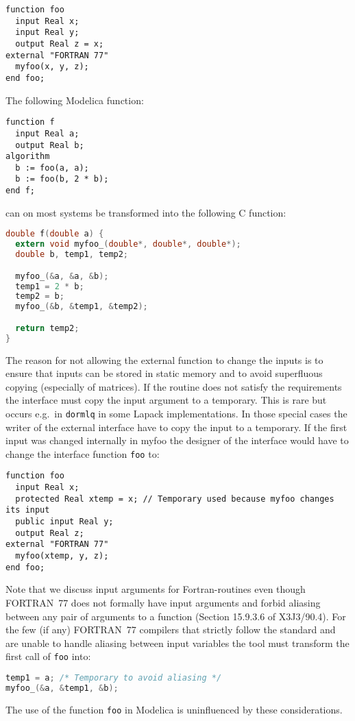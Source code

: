 \begin{example}
\begin{lstlisting}[language=modelica]
function foo
  input Real x;
  input Real y;
  output Real z = x;
external "FORTRAN 77"
  myfoo(x, y, z);
end foo;
\end{lstlisting}
The following Modelica function:
\begin{lstlisting}[language=modelica]
function f
  input Real a;
  output Real b;
algorithm
  b := foo(a, a);
  b := foo(b, 2 * b);
end f;
\end{lstlisting}
can on most systems be transformed into the following C function:
\begin{lstlisting}[language=C]
double f(double a) {
  extern void myfoo_(double*, double*, double*);
  double b, temp1, temp2;

  myfoo_(&a, &a, &b);
  temp1 = 2 * b;
  temp2 = b;
  myfoo_(&b, &temp1, &temp2);

  return temp2;
}
\end{lstlisting}

The reason for not allowing the external function to change the
inputs is to ensure that inputs can be stored in static memory and to
avoid superfluous copying (especially of matrices). If the routine does
not satisfy the requirements the interface must copy the input argument
to a temporary. This is rare but occurs e.g.\ in \lstinline!dormlq! in some
Lapack implementations. In those special cases the writer of the
external interface have to copy the input to a temporary. If the first
input was changed internally in myfoo the designer of the interface
would have to change the interface function \lstinline!foo! to:
\begin{lstlisting}[language=modelica]
function foo
  input Real x;
  protected Real xtemp = x; // Temporary used because myfoo changes its input
  public input Real y;
  output Real z;
external "FORTRAN 77"
  myfoo(xtemp, y, z);
end foo;
\end{lstlisting}

Note that we discuss input arguments for Fortran-routines even
though FORTRAN~77 does not formally have input arguments and forbid
aliasing between any pair of arguments to a function (Section 15.9.3.6
of X3J3/90.4). For the few (if any) FORTRAN~77 compilers that strictly
follow the standard and are unable to handle aliasing between input
variables the tool must transform the first call of \lstinline!foo! into:
\begin{lstlisting}[language=C]
temp1 = a; /* Temporary to avoid aliasing */
myfoo_(&a, &temp1, &b);
\end{lstlisting}

The use of the function \lstinline!foo! in Modelica is uninfluenced by these considerations.
\end{example}


